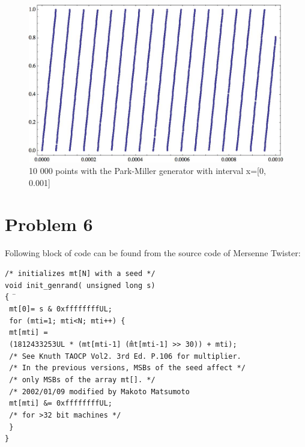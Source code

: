 \documentclass[12pt]{article}
\numberwithin{equation}{section}
\numberwithin{table}{section}
\begin{document}
\begin{figure}
\caption{10 000 points with the Park-Miller generator with interval x=[0, 0.001]}
\includegraphics[width=15cm]{pm4.jpg}
\end{figure}



\section*{Problem 6}
Following block of code can be found from the source code of Mersenne Twister:

\begin{tabbing}
\texttt{/* initializes mt[N] with a seed */}\\
\texttt{void init\_genrand( unsigned long s) }\\
\texttt{\{} \ \= \+ \\
\texttt{ mt[0]= s \& 0xffffffffUL;}  \\
\texttt{    for}\=\texttt{ (mti=1; mti<N; mti++) \{ }\+\\
\texttt{        mt[mti] = }\\
\texttt{	    (1812433253UL * (mt[mti-1] \^ (mt[mti-1] >> 30)) + mti); }\\
\texttt{        /* See Knuth TAOCP Vol2. 3rd Ed. P.106 for multiplier.}\\ %
\texttt{       /* In the previous versions, MSBs of the seed affect  */}\\
\texttt{        /* only MSBs of the array mt[].                        */}\\
\texttt{        /* 2002/01/09 modified by Makoto Matsumoto            }\\ %
\texttt{       mt[mti] \&= 0xffffffffUL;}\\
\- \texttt{       /* for >32 bit machines */}\\
\- \texttt{    \}}\\
\texttt{\}}
\end{tabbing}
\end{document}
